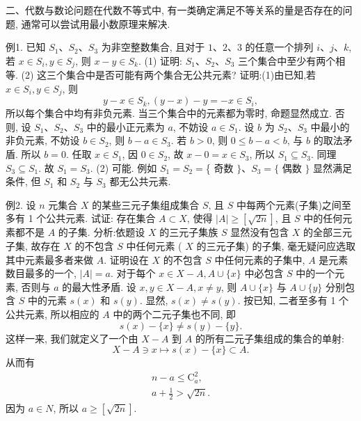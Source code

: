 
二、代数与数论问题在代数不等式中, 有一类确定满足不等关系的量是否存在的问题, 通常可以尝试用最小数原理来解决.



例1. 已知 $S_1 、 S_2 、 S_3$ 为非空整数集合, 且对于 $1 、 2 、 3$ 的任意一个排列 $i 、 j 、 k$, 若 $x \in S_i, y \in S_j$, 则 $x-y \in S_k$.
(1) 证明: $S_1 、 S_2 、 S_3$ 三个集合中至少有两个相等.
(2) 这三个集合中是否可能有两个集合无公共元素?
证明:(1)由已知,若 $x \in S_i, y \in S_j$, 则
$$
y-x \in S_k,(y-x)-y=-x \in S_i,
$$
所以每个集合中均有非负元素.
当三个集合中的元素都为零时, 命题显然成立.
否则, 设 $S_1 、 S_2 、 S_3$ 中的最小正元素为 $a$, 不妨设 $a \in S_1$. 设 $b$ 为 $S_2 、 S_3$ 中最小的非负元素, 不妨设 $b \in S_2$, 则 $b-a \in S_3$.
若 $b>0$, 则 $0 \leqslant b-a<b$, 与 $b$ 的取法矛盾.
所以 $b=0$.
任取 $x \in S_1$, 因 $0 \in S_2$, 故 $x-0=x \in S_3$, 所以 $S_1 \subseteq S_3$. 同理 $S_3 \subseteq S_1$. 故 $S_1=S_3$.
(2) 可能.
例如 $S_1=S_2=$\{ 奇数 $\} 、 S_3=\{$ 偶数 $\}$ 显然满足条件, 但 $S_1$ 和 $S_2$ 与 $S_3$ 都无公共元素.



例2. 设 $n$ 元集合 $X$ 的某些三元子集组成集合 $S$, 且 $S$ 中每两个元素(子集)之间至多有 1 个公共元素.
试证: 存在集合 $A \subset X$, 使得 $|A| \geqslant[\sqrt{2 n}]$, 且 $S$ 中的任何元素都不是 $A$ 的子集.
分析:依题设 $X$ 的三元子集族 $S$ 显然没有包含 $X$ 的全部三元子集, 故存在 $X$ 的不包含 $S$ 中任何元素 ( $X$ 的三元子集) 的子集, 毫无疑问应选取其中元素最多者来做 $A$.
证明设在 $X$ 的不包含 $S$ 中任何元素的子集中, $A$ 是元素数目最多的一个, $|A|=a$. 对于每个 $x \in X-A, A \cup\{x\}$ 中必包含 $S$ 中的一个元素, 否则与 $a$ 的最大性矛盾.
设 $x, y \in X-A, x \neq y$, 则 $A \cup\{x\}$ 与 $A \cup\{y\}$ 分别包含 $S$ 中的元素 $s(x)$ 和 $s(y)$. 显然, $s(x) \neq s(y)$. 按已知, 二者至多有 1 个公共元素, 所以相应的 $A$ 中的两个二元子集也不同, 即
$$
s(x)-\{x\} \neq s(y)-\{y\} .
$$
这样一来, 我们就定义了一个由 $X-A$ 到 $A$ 的所有二元子集组成的集合的单射:
$$
X-A \ni x \longmapsto s(x)-\{x\} \subset A .
$$
从而有
$$
\begin{gathered}
n-a \leqslant \mathrm{C}_a^2, \\
a+\frac{1}{2}>\sqrt{2 n} .
\end{gathered}
$$
因为 $a \in N$, 所以 $a \geqslant[\sqrt{2 n}]$.



